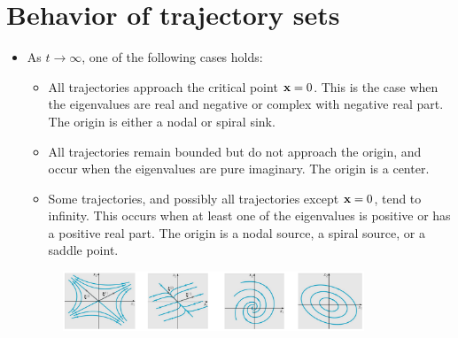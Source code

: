 \documentclass[11pt,a4paper]{article}
\begin{document}
	\section*{Behavior of trajectory sets}

	\begin{itemize}
		\item As $t \to \infty$, one of the following cases holds:
		\begin{itemize}
			\item[\labelitemi] All trajectories approach the critical point $\vb{x} = 0$. This is the case when the eigenvalues are real and negative or complex with negative real part. The origin is either a nodal or spiral sink.
			\item[\labelitemi] All trajectories remain bounded but do not approach the origin, and occur when the eigenvalues are pure imaginary. The origin is a center.
			\item[\labelitemi] Some trajectories, and possibly all trajectories except $\vb{x} = 0$, tend to infinity. This occurs when at least one of the eigenvalues is positive or  has a positive real part. The origin is a nodal source, a spiral source, or a saddle point.
		\end{itemize}
		\begin{figure}[H]
			\centering
				\includegraphics[width=0.85\textwidth]{figure/Lec16f3.PNG}
		\end{figure}
	\end{itemize}
\end{document}
